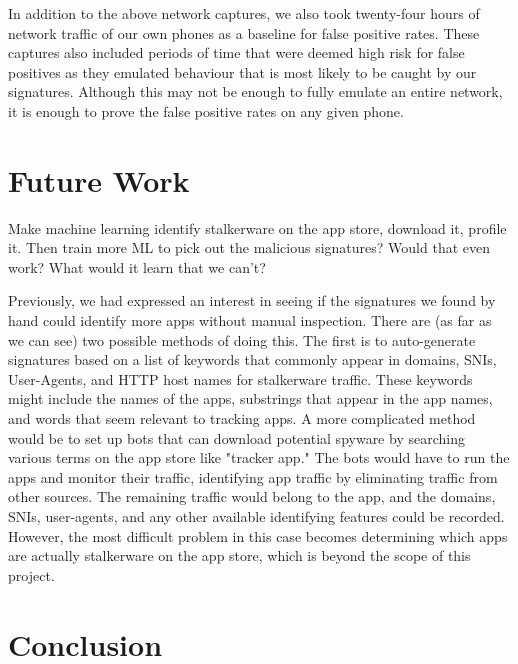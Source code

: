 \documentclass[acmtog]{acmart}
\begin{document}
In addition to the above network captures, we also took twenty-four hours of 
network traffic of our own phones as a baseline for false positive rates. These 
captures also included periods of time that were deemed high risk for false 
positives as they emulated behaviour that is most likely to be caught by our 
signatures. Although this may not be enough to fully emulate an entire network, 
it is enough to prove the false positive rates on any given phone.



\section{Future Work}

Make machine learning identify stalkerware on the app store, download it, 
profile it. Then train more ML to pick out the malicious signatures? Would that 
even work? What would it learn that we can't?

Previously, we had expressed an interest in seeing if the signatures we found 
by hand could identify more apps without manual inspection. There are (as far 
as we can see) two possible methods of doing this. The first is to 
auto-generate signatures based on a list of keywords that commonly appear in 
domains, SNIs, User-Agents, and HTTP host names for stalkerware traffic. These 
keywords might include the names of the apps, substrings that appear in the app 
names, and words that seem relevant to tracking apps. A more complicated method 
would be to set up bots that can download potential spyware by searching 
various terms on the app store like "tracker app." The bots would have to run 
the apps and monitor their traffic, identifying app traffic by eliminating 
traffic from other sources. The remaining traffic would belong to the app, and 
the domains, SNIs, user-agents, and any other available identifying features 
could be recorded. However, the most difficult problem in this case becomes 
determining which apps are actually stalkerware on the app store, which is 
beyond the scope of this project. 

\section{Conclusion}




\appendix
\end{document}

